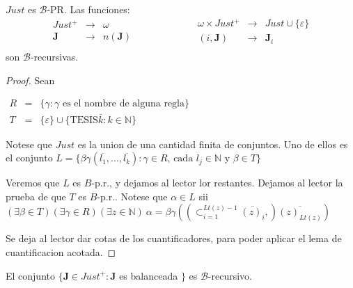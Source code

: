  \begin{lemma} \label{lemma_108}
    \PN $Just$ es $\mathcal{B}$-PR. Las funciones:
    \begin{equation*}
      \begin{aligned}
        Just^{+} &\rightarrow& \omega \\
        \mathbf{J} &\rightarrow& n(\mathbf{J}) \\
      \end{aligned}
      \qquad\qquad\qquad
      \begin{aligned}
        \omega \times Just^{+} &\rightarrow& Just \cup \{\varepsilon\} \\
        (i, \mathbf{J}) &\rightarrow& \mathbf{J}_{i} \\
      \end{aligned}
    \end{equation*}
    \PN son $\mathcal{B}$-recursivas.
  \end{lemma}
  \begin{proof}
    Sean

    $\displaystyle \begin{array}{rcl} R & =& \{\gamma :\gamma \text{ es el nombre de alguna regla}\} \\ T & =& \{\varepsilon \}\cup \{\text{TESIS}\bar{k}:k\in \mathbb{N}\} \end{array} $

    Notese que $Just$ es la union de una cantidad finita de conjuntos. Uno de ellos es el conjunto
    $\displaystyle L=\{\beta \gamma (\overline{l_{1}},...,\overline{l_{k}}):\gamma \in R\text{, cada }l_{j}\in \mathbb{N}\text{ y }\beta \in T\} $

    Veremos que $L$ es $B$-p.r., y dejamos al lector lor restantes. Dejamos al lector la prueba de que $T$ es $B$-p.r.. Notese que $\alpha \in L$ sii
    $\displaystyle (\exists \beta \in T)(\exists \gamma \in R)(\exists z\in \mathbb{N})\ \alpha =\beta \gamma (\left( \subset _{i=1}^{Lt(z)-1}\overline{(z)_{i}},\right) \overline{(z)_{Lt(z)}}) $

    Se deja al lector dar cotas de los cuantificadores, para poder aplicar el lema de cuantificacion acotada.
  \end{proof}

  \begin{lemma} \label{lemma_109}
    \PN El conjunto $\{\mathbf{J} \in Just^{+}: \mathbf{J}$ es balanceada $\}$ es $\mathcal{B}$-recursivo.
  \end{lemma}

